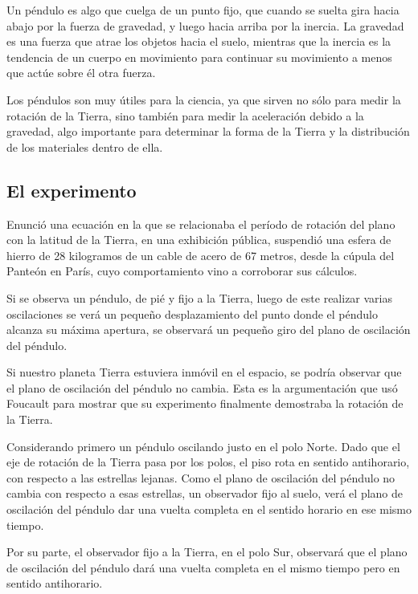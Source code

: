 \documentclass[journal]{IEEEtran}
\begin{document}
Un péndulo es algo que cuelga de un punto fijo, que cuando se suelta gira hacia abajo por la fuerza de gravedad, y luego hacia arriba por la inercia. La gravedad es una fuerza que atrae los objetos hacia el suelo, mientras que la inercia es la tendencia de un cuerpo en movimiento para continuar su movimiento a menos que actúe sobre él otra fuerza.

Los péndulos son muy útiles para la ciencia, ya que sirven no sólo para medir la rotación de la Tierra, sino también para medir la aceleración debido a la gravedad, algo importante para determinar la forma de la Tierra y la distribución de los materiales dentro de ella.

\subsection{El experimento}

Enunció una ecuación en la que se relacionaba el período de rotación del plano con la latitud de la Tierra, en una exhibición pública, suspendió una esfera de hierro de 28 kilogramos de un cable de acero de 67 metros, desde la cúpula del Panteón en París, cuyo comportamiento vino a corroborar sus cálculos.

Si se observa un péndulo, de pié y fijo a la Tierra, luego de este realizar varias oscilaciones se verá un pequeño desplazamiento del punto donde el péndulo alcanza su máxima apertura, se observará un pequeño giro del plano de oscilación del péndulo.

Si nuestro planeta Tierra estuviera inmóvil en el espacio, se podría observar que el plano de oscilación del péndulo no cambia. Esta es la argumentación que usó Foucault para mostrar que su experimento finalmente demostraba la rotación de la Tierra.

Considerando primero un péndulo oscilando justo en el polo Norte. Dado que el eje de rotación de la Tierra pasa por los polos, el piso rota en sentido antihorario, con respecto a las estrellas lejanas. Como el plano de oscilación del péndulo no cambia con respecto a esas estrellas, un observador fijo al suelo, verá el plano de oscilación del péndulo dar una vuelta completa en el sentido horario en ese mismo tiempo. 

Por su parte, el observador fijo a la Tierra, en el polo Sur, observará que el plano de oscilación del péndulo dará una vuelta completa en el mismo tiempo pero en sentido antihorario.
\end{document}
